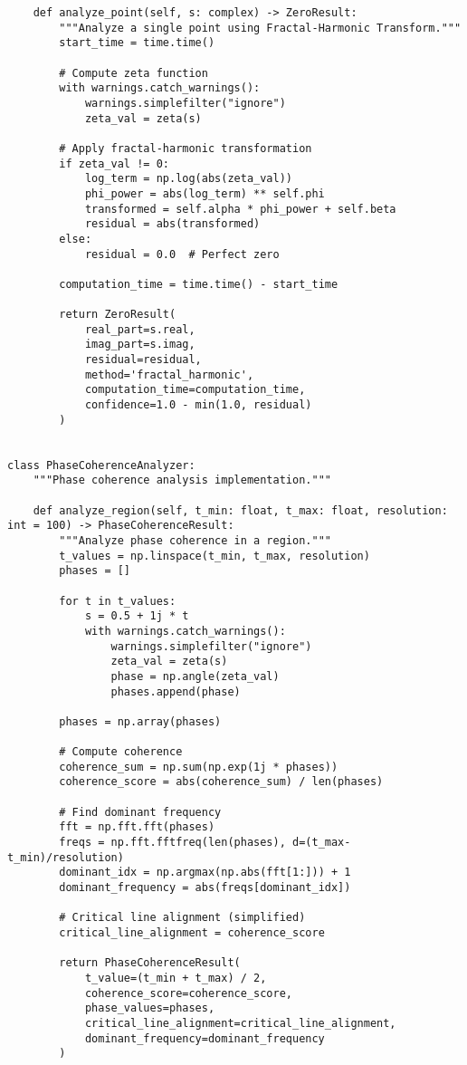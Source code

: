 \documentclass[12pt]{article}
\begin{document}
\begin{lstlisting}
    def analyze_point(self, s: complex) -> ZeroResult:
        """Analyze a single point using Fractal-Harmonic Transform."""
        start_time = time.time()

        # Compute zeta function
        with warnings.catch_warnings():
            warnings.simplefilter("ignore")
            zeta_val = zeta(s)

        # Apply fractal-harmonic transformation
        if zeta_val != 0:
            log_term = np.log(abs(zeta_val))
            phi_power = abs(log_term) ** self.phi
            transformed = self.alpha * phi_power + self.beta
            residual = abs(transformed)
        else:
            residual = 0.0  # Perfect zero

        computation_time = time.time() - start_time

        return ZeroResult(
            real_part=s.real,
            imag_part=s.imag,
            residual=residual,
            method='fractal_harmonic',
            computation_time=computation_time,
            confidence=1.0 - min(1.0, residual)
        )


class PhaseCoherenceAnalyzer:
    """Phase coherence analysis implementation."""

    def analyze_region(self, t_min: float, t_max: float, resolution: int = 100) -> PhaseCoherenceResult:
        """Analyze phase coherence in a region."""
        t_values = np.linspace(t_min, t_max, resolution)
        phases = []

        for t in t_values:
            s = 0.5 + 1j * t
            with warnings.catch_warnings():
                warnings.simplefilter("ignore")
                zeta_val = zeta(s)
                phase = np.angle(zeta_val)
                phases.append(phase)

        phases = np.array(phases)

        # Compute coherence
        coherence_sum = np.sum(np.exp(1j * phases))
        coherence_score = abs(coherence_sum) / len(phases)

        # Find dominant frequency
        fft = np.fft.fft(phases)
        freqs = np.fft.fftfreq(len(phases), d=(t_max-t_min)/resolution)
        dominant_idx = np.argmax(np.abs(fft[1:])) + 1
        dominant_frequency = abs(freqs[dominant_idx])

        # Critical line alignment (simplified)
        critical_line_alignment = coherence_score

        return PhaseCoherenceResult(
            t_value=(t_min + t_max) / 2,
            coherence_score=coherence_score,
            phase_values=phases,
            critical_line_alignment=critical_line_alignment,
            dominant_frequency=dominant_frequency
        )



\end{lstlisting}
\end{document}
